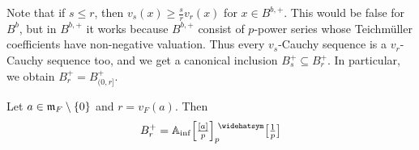 \documentclass[a4paper, 10pt, oneside, DIV=9, chapterprefix=true, numbers=enddot,bibliography=totoc]{scrbook}
\begin{document}
\begin{rem}\label{rem:Bs+}
	Note that if $s\leq r$, then $v_s(x)\geq \frac{s}{r}v_r(x)$ for $x\in B^{b,+}$. This would be false for $B^b$, but in $B^{b,+}$ it works because $B^{b,+}$ consist of $p$-power series whose Teichmüller coefficients have non-negative valuation. Thus every $v_s$-Cauchy sequence is a $v_r$-Cauchy sequence too, and we get a canonical inclusion $B_s^+\subseteq B_r^+$. In particular, we obtain $B_r^+=B_{(0,r]}^+$.
\end{rem}
\begin{lem}\label{lem:Br+Ainfap}
	Let $a\in\mathfrak{m}_F\setminus\{0\}$ and $r=v_F(a)$. Then
	\begin{equation*}
		B_r^+=\IA_\inf\Big[\textstyle\frac{[a]}p\Big]_p^\complete\localize{p}
	\end{equation*}
\end{lem}
\end{document}

